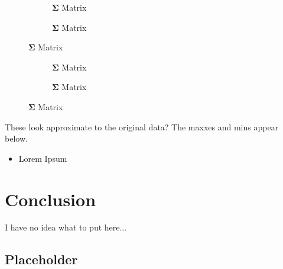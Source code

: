 \documentclass[letterpaper,12pt]{article}
\begin{document}
\begin{figure}[H]
    \begin{adjustwidth}{-1in}{-1in}
    \centering
    \begin{subfigure}[b]{0.60\textwidth}
        \centering
        
        \caption{\(\mathbf{\Sigma}\) Matrix}
    \end{subfigure}
    \begin{subfigure}[b]{0.60\textwidth}
        \centering
        
        \caption{\(\mathbf{\Sigma}\) Matrix}
    \end{subfigure}
    \end{adjustwidth}
\end{figure}
\begin{figure}[H]
    \begin{adjustwidth}{-1in}{-1in}
    \centering
    \begin{subfigure}[b]{0.65\textwidth}
        \centering
        
        \caption{\(\mathbf{\Sigma}\) Matrix}
    \end{subfigure}
    \begin{subfigure}[b]{0.65\textwidth}
        \centering
        
        \caption{\(\mathbf{\Sigma}\) Matrix}
    \end{subfigure}
    \end{adjustwidth}
\end{figure}
These look approximate to the original data? 
The maxxes and mins appear below.
\begin{itemize}
    \item Lorem Ipsum
\end{itemize}
\section{Conclusion}
I have no idea what to put here...
\pagebreak
\begin{appendices}
    \section{Placeholder} \label{appendix:A}
\end{appendices}
\end{document}
